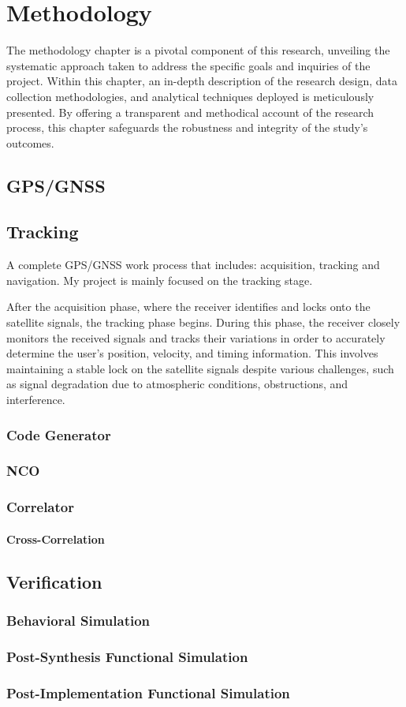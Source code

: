 \chapter{Methodology}
The methodology chapter is a pivotal component of this research, unveiling the systematic approach taken to address the specific goals and inquiries of the project. Within this chapter, an in-depth description of the research design, data collection methodologies, and analytical techniques deployed is meticulously presented. By offering a transparent and methodical account of the research process, this chapter safeguards the robustness and integrity of the study's outcomes.

\section{GPS/GNSS}

\section{Tracking}
A complete GPS/GNSS work process that includes: acquisition, tracking and navigation. My project is mainly focused on the tracking stage.

After the acquisition phase, where the receiver identifies and locks onto the satellite signals, the tracking phase begins. During this phase, the receiver closely monitors the received signals and tracks their variations in order to accurately determine the user's position, velocity, and timing information. This involves maintaining a stable lock on the satellite signals despite various challenges, such as signal degradation due to atmospheric conditions, obstructions, and interference.
\subsection{Code Generator}

\subsection{NCO}

\subsection{Correlator}
\subsubsection{Cross-Correlation}


\section{Verification}
\subsection{Behavioral Simulation}
\subsection{Post-Synthesis Functional Simulation}
\subsection{Post-Implementation Functional Simulation}
